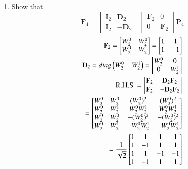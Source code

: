 \documentclass[journal,12pt,twocolumn]{IEEEtran}
\let\vec\mathbf
\renewcommand\thesection{\arabic{section}}
\begin{document}
\begin{enumerate}[label=\arabic*.,ref=\thesection.\theenumi]
\item Show that 
\begin{equation}
	\vec{F}_{4}=
	\begin{bmatrix}
		\vec{I}_{2} & \vec{D}_{2} \\
		\vec{I}_{2} & -\vec{D}_{2}
	\end{bmatrix}
	\begin{bmatrix}
		\vec{F}_{2} & 0 \\
		0 & \vec{F}_{2}
	\end{bmatrix}
	\vec{P}_{4}
\end{equation}
\solution
\begin{align}
	\vec{F}_{2} = 
	\begin{bmatrix}
		W_{2}^0	&	W_{2}^0\\
		W_{2}^0	&	W_{2}^1
	\end{bmatrix}
	=		\begin{bmatrix}
		1	&	1\\
		1	&	-1
	\end{bmatrix}\\
	\vec{D}_2 = diag\myvec{W_2^0 & W_2^1} = 
	\begin{bmatrix}
		W_2^0 &	0\\
		0	&	W_2^1 
	\end{bmatrix}\\
\text{R.H.S } = 
\begin{bmatrix}
	\vec{F}_{2} & \vec{D}_{2} \vec{F}_{2}\\
	\vec{F}_{2} & -\vec{D}_{2} \vec{F}_{2}\\
\end{bmatrix}\\
	=\begin{bmatrix}
		W_{2}^0	&	W_{2}^0	&	(W_{2}^0)^2	&	(W_{2}^0)^2\\
		W_{2}^0	&	W_{2}^1	&	W_{2}^0 W_{2}^1	&	W_{2}^0 W_{2}^1\\
		W_{2}^0	&	W_{2}^0	&	-(W_{2}^0)^2	&	-(W_{2}^0)^2\\
		W_{2}^0	&	W_{2}^1	&	-W_{2}^0 W_{2}^1	&	-W_{2}^0 W_{2}^1\\
	\end{bmatrix}\\
		=\frac{1}{\sqrt{2}}\begin{bmatrix}
		1	&	1	&	1	&	1\\
		1	&	-1	&	1	&	1\\
		1	&	1	&	-1	&	-1\\
		1	&	-1	&	1	&	1\\

\end{bmatrix}
\end{align}
\end{enumerate}
\end{document}
